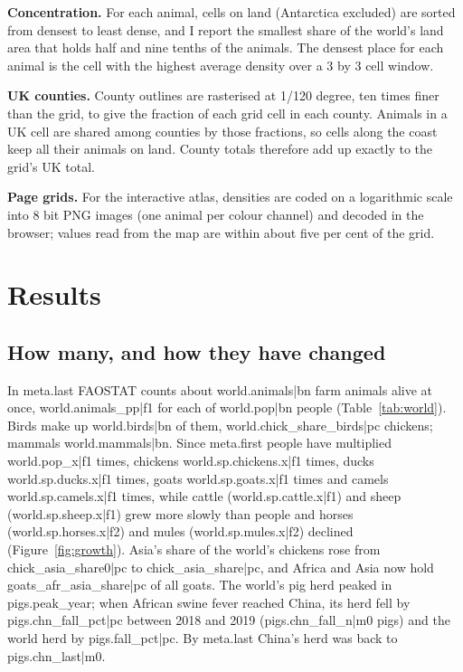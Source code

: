 \documentclass[11pt,a4paper]{article}
\begin{document}
\textbf{Concentration.} For each animal, cells on land (Antarctica excluded) are sorted from densest to least dense, and I report the smallest share of the world's land area that holds half and nine tenths of the animals. The densest place for each animal is the cell with the highest average density over a 3 by 3 cell window.

\textbf{UK counties.} County outlines are rasterised at 1/120 degree, ten times finer than the grid, to give the fraction of each grid cell in each county. Animals in a UK cell are shared among counties by those fractions, so cells along the coast keep all their animals on land. County totals therefore add up exactly to the grid's UK total.

\textbf{Page grids.} For the interactive atlas, densities are coded on a logarithmic scale into 8 bit PNG images (one animal per colour channel) and decoded in the browser; values read from the map are within about five per cent of the grid.

\section{Results}
\subsection{How many, and how they have changed}
In {{meta.last}} FAOSTAT counts about {{world.animals|bn}} farm animals alive at once, {{world.animals_pp|f1}} for each of {{world.pop|bn}} people (Table~\ref{tab:world}). Birds make up {{world.birds|bn}} of them, {{world.chick_share_birds|pc}} chickens; mammals {{world.mammals|bn}}. Since {{meta.first}} people have multiplied {{world.pop_x|f1}} times, chickens {{world.sp.chickens.x|f1}} times, ducks {{world.sp.ducks.x|f1}} times, goats {{world.sp.goats.x|f1}} times and camels {{world.sp.camels.x|f1}} times, while cattle ({{world.sp.cattle.x|f1}}) and sheep ({{world.sp.sheep.x|f1}}) grew more slowly than people and horses ({{world.sp.horses.x|f2}}) and mules ({{world.sp.mules.x|f2}}) declined (Figure~\ref{fig:growth}). Asia's share of the world's chickens rose from {{chick_asia_share0|pc}} to {{chick_asia_share|pc}}, and Africa and Asia now hold {{goats_afr_asia_share|pc}} of all goats. The world's pig herd peaked in {{pigs.peak_year}}; when African swine fever reached China, its herd fell by {{pigs.chn_fall_pct|pc}} between 2018 and 2019 ({{pigs.chn_fall_n|m0}} pigs) and the world herd by {{pigs.fall_pct|pc}}. By {{meta.last}} China's herd was back to {{pigs.chn_last|m0}}.
\end{document}
